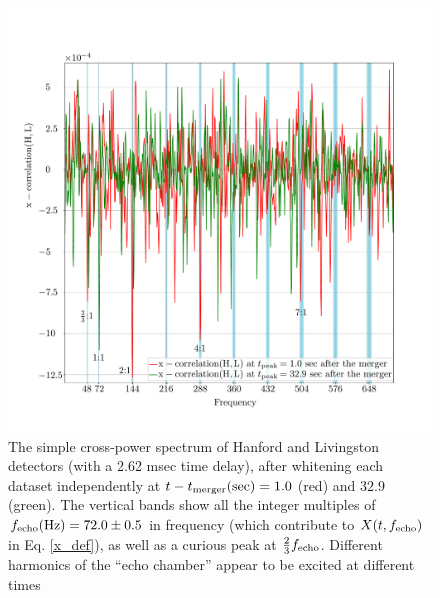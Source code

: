 \documentclass[a4paper,11pt]{article}
\begin{document}
\begin{enumerate}
\begin{figure}[!tbp]
    \includegraphics[scale=0.5,center]{whitened_peaks.pdf}
 \caption{The simple cross-power spectrum of Hanford and Livingston detectors (with a 2.62 msec time delay), after whitening each dataset independently at $t-t_{\rm merger}({\rm sec}) = 1.0$ (red) and $32.9$ (green). The vertical bands show all the integer multiples of $f_{\rm echo}({\rm Hz}) = 72.0 \pm 0.5$ in frequency (which contribute to $X(t,f_{\rm echo})$ in Eq. \ref{x_def}), as well as a curious peak at $\frac{2}{3} f_{\rm echo}$. Different harmonics of the ``echo chamber'' appear to be excited at different times  }
 \label{whitened}
\end{figure}



\end{enumerate}
\end{document}
